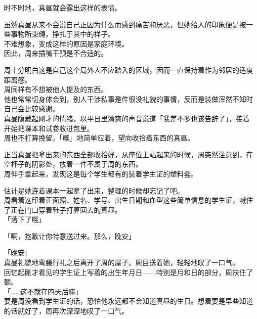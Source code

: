 时不时地，真昼就会露出这样的表情。

虽然真昼从来不会说自己正因为什么而感到痛苦和厌恶，但她给人的印象便是被一些事物所束缚，挣扎于其中的样子。\\

不难想象，变成这样的原因是家庭环境。\\

因此，周来插嘴干预是不合适的。

周十分明白这是自己这个局外人不应踏入的区域，因而一直保持着作为邻居的适度距离感。\\

周同样有不想被他人提及的东西。\\

他也常常切身体会到，别人干涉私事是件很没礼貌的事情，反而是装做浑然不知时自己会比较感谢。\\

真昼隐藏起刚才的情绪，以平日里清爽的声音说道「我差不多也该告辞了」，接着开始把课本和试卷收进包里。\\

周也不打算挽留，「噢」地简单应着，望向收拾着东西的真昼。

正当真昼把拿出来的东西全部收拾好，从座位上站起来的时候，周突然注意到，在空杯子的阴影处，放着一件不属于周的东西。\\

周伸手拿起来，发现这是每个学生都有的装着学生证的塑料套。

估计是她连着课本一起拿了出来，整理的时候却忘记了吧。\\

周看着这印着正面照、姓名、学号、出生日期和血型这些简单信息的学生证，喊住了正在门口穿着鞋子打算回去的真昼。\\

「落下了哦」

「啊，抱歉让你特意送过来。那么，晚安」

「晚安」\\

真昼礼貌地弯腰行礼之后离开了周的屋子。周目送着她，轻轻地叹了一口气。\\

回忆起刚才看见的学生证上写着的出生年月日——特别是月和日的部分，周扶住了额。\\

「……这不就在四天后嘛」\\

要是周没看到学生证的话，恐怕他永远都不会知道真昼的生日。想着要是早些知道的话就好了，周再次深深地叹了一口气。

